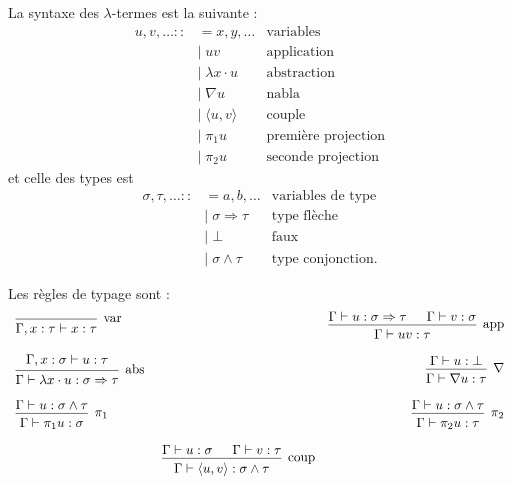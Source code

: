 \documentclass[a4paper]{article}
\theoremstyle{remark}
\theoremstyle{remark}
\theoremstyle{remark}
\theoremstyle{definition}
\theoremstyle{definition}
\theoremstyle{definition}
\begin{document}
La syntaxe des $\lambda$-termes est la suivante :
\begin{align*}
u, v, \ldots ::&= x, y, \ldots & \text{variables}\\
&| \; uv & \text{application} \\
&| \; \lambda x \cdot u & \text{abstraction} \\
&| \; \nabla u & \text{nabla} \\
&| \; \langle u, v \rangle & \text{couple} \\
&| \; \pi_1 u & \text{première projection} \\
&| \; \pi_2 u & \text{seconde projection}
\end{align*} et celle des types est \begin{align*}
\sigma, \tau, \ldots ::&= a, b, \ldots & \text{variables de type} \\
&| \; \sigma \Rightarrow \tau & \text{type flèche} \\
&| \; \bot & \text{faux} \\
&| \; \sigma \wedge \tau & \text{type conjonction}.
\end{align*}

Les règles de typage sont :
\[ \begin{array}{lcr}
\text{\begin{prooftree}
\infer0[var]{\Gamma, x : \tau \vdash x : \tau}
\end{prooftree}} & &
\text{\begin{prooftree}
\hypo{\Gamma \vdash u : \sigma \Rightarrow \tau}
\hypo{\Gamma \vdash v : \sigma}
\infer2[app]{\Gamma \vdash uv : \tau}
\end{prooftree}} \\
& & \\
\text{\begin{prooftree}
\hypo{\Gamma, x : \sigma \vdash u : \tau}
\infer1[abs]{\Gamma \vdash \lambda x \cdot u : \sigma \Rightarrow \tau}
\end{prooftree}} & &
\text{\begin{prooftree}
\hypo{\Gamma \vdash u : \bot}
\infer1[$\nabla$]{\Gamma \vdash \nabla u : \tau}
\end{prooftree}} \\
& & \\
\text{\begin{prooftree}
\hypo{\Gamma \vdash u : \sigma \wedge \tau}
\infer1[$\pi_1$]{\Gamma \vdash \pi_1 u : \sigma}
\end{prooftree}} & &
\text{\begin{prooftree}
\hypo{\Gamma \vdash u : \sigma \wedge \tau}
\infer1[$\pi_2$]{\Gamma \vdash \pi_2 u : \tau}
\end{prooftree}} \\
& & \\
& \text{
\begin{prooftree}
\hypo{\Gamma \vdash u : \sigma}
\hypo{\Gamma \vdash v : \tau}
\infer2[coup]{\Gamma \vdash \langle u, v \rangle : \sigma \wedge \tau}
\end{prooftree}} &
\end{array} \]

\end{document}
